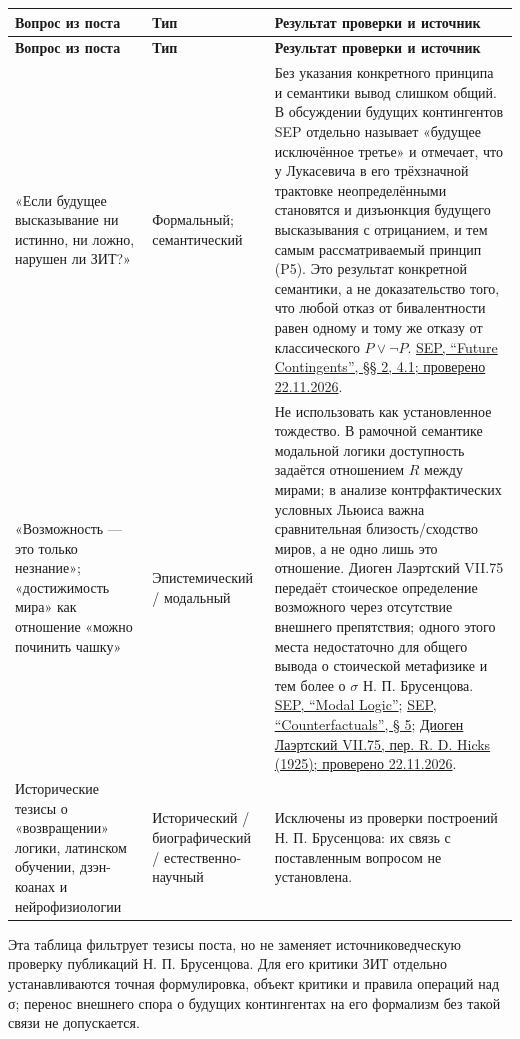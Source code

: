 \documentclass[12pt,a4paper]{article}
\begin{document}
\begin{longtable}{P{0.24\textwidth}P{0.22\textwidth}P{0.43\textwidth}}
\toprule
\textbf{Вопрос из поста} & \textbf{Тип} & \textbf{Результат проверки и источник} \\
\midrule
\endfirsthead
\toprule
\textbf{Вопрос из поста} & \textbf{Тип} & \textbf{Результат проверки и источник} \\
\midrule
\endhead
«Если будущее высказывание ни истинно, ни ложно, нарушен ли ЗИТ?» & Формальный; семантический & Без указания конкретного принципа и семантики вывод слишком общий. В обсуждении будущих контингентов SEP отдельно называет «будущее исключённое третье» и отмечает, что у Лукасевича в его трёхзначной трактовке неопределёнными становятся и дизъюнкция будущего высказывания с отрицанием, и тем самым рассматриваемый принцип (P5). Это результат конкретной семантики, а не доказательство того, что любой отказ от бивалентности равен одному и тому же отказу от классического \(P\lor\neg P\). \href{https://plato.stanford.edu/entries/future-contingents/}{SEP, “Future Contingents”, §§ 2, 4.1; проверено 22.11.2026}. \\
«Возможность — это только незнание»; «достижимость мира» как отношение «можно починить чашку» & Эпистемический / модальный & Не использовать как установленное тождество. В рамочной семантике модальной логики доступность задаётся отношением \(R\) между мирами; в анализе контрфактических условных Льюиса важна сравнительная близость/сходство миров, а не одно лишь это отношение. Диоген Лаэртский VII.75 передаёт стоическое определение возможного через отсутствие внешнего препятствия; одного этого места недостаточно для общего вывода о стоической метафизике и тем более о \(\sigma\) Н. П. Брусенцова. \href{https://plato.stanford.edu/entries/logic-modal/}{SEP, “Modal Logic”}; \href{https://plato.stanford.edu/entries/counterfactuals/}{SEP, “Counterfactuals”, § 5}; \href{https://www.whatwouldstoicsdo.com/passage/lives-of-the-stoics/7.75}{Диоген Лаэртский VII.75, пер. R. D. Hicks (1925); проверено 22.11.2026}. \\
Исторические тезисы о «возвращении» логики, латинском обучении, дзэн-коанах и нейрофизиологии & Исторический / биографический / естественно-научный & Исключены из проверки построений Н. П. Брусенцова: их связь с поставленным вопросом не установлена. \\
\bottomrule
\end{longtable}

Эта таблица фильтрует тезисы поста, но не заменяет источниковедческую проверку публикаций Н. П. Брусенцова. Для его критики ЗИТ отдельно устанавливаются точная формулировка, объект критики и правила операций над σ; перенос внешнего спора о будущих контингентах на его формализм без такой связи не допускается.
\end{document}

